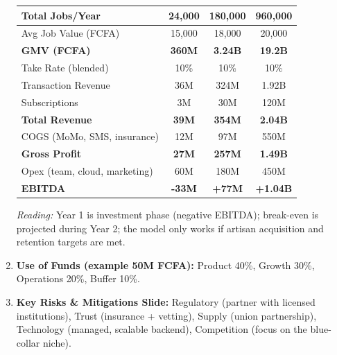 \documentclass[11pt]{article}
\begin{document}
\begin{methode}
\begin{enumerate}
\begin{center}
\begin{tabularx}{\linewidth}{|X|c|c|c|}
    Total Jobs/Year & 24,000 & 180,000 & 960,000 \\ \hline
    Avg Job Value (FCFA) & 15,000 & 18,000 & 20,000 \\ \hline
    \textbf{GMV (FCFA)} & \textbf{360M} & \textbf{3.24B} & \textbf{19.2B} \\ \hline
    Take Rate (blended) & 10\% & 10\% & 10\% \\ \hline
    Transaction Revenue & 36M & 324M & 1.92B \\ \hline
    Subscriptions & 3M & 30M & 120M \\ \hline
    \textbf{Total Revenue} & \textbf{39M} & \textbf{354M} & \textbf{2.04B} \\ \hline
    COGS (MoMo, SMS, insurance) & 12M & 97M & 550M \\ \hline
    \textbf{Gross Profit} & \textbf{27M} & \textbf{257M} & \textbf{1.49B} \\ \hline
    Opex (team, cloud, marketing) & 60M & 180M & 450M \\ \hline
    \textbf{EBITDA} & \textbf{-33M} & \textbf{+77M} & \textbf{+1.04B} \\ \hline
    \end{tabularx}
    \end{center}
    \emph{Reading:} Year 1 is investment phase (negative EBITDA); break-even is projected during Year 2; the model only works if artisan acquisition and retention targets are met.
    \item \textbf{Use of Funds (example 50M FCFA):} Product 40\%, Growth 30\%, Operations 20\%, Buffer 10\%.
    \item \textbf{Key Risks \& Mitigations Slide:} Regulatory (partner with licensed institutions), Trust (insurance + vetting), Supply (union partnership), Technology (managed, scalable backend), Competition (focus on the blue-collar niche).
\end{enumerate}
\end{methode}
\end{document}
